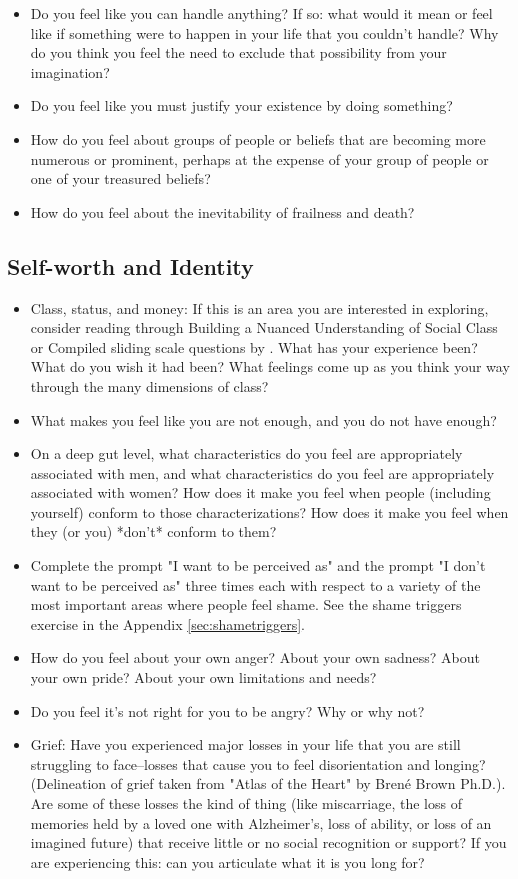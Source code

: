 \documentclass[12pt,letterpaper]{book}
\begin{document}
\begin{itemize}
    \item Do you feel like you can handle anything? If so: what would it mean or feel like if something were to happen in your life that you couldn't handle? Why do you think you feel the need to exclude that possibility from your imagination?
    \item Do you feel like you must justify your existence by doing something?
    \item How do you feel about groups of people or beliefs that are becoming more numerous or prominent, perhaps at the expense of your group of people or one of your treasured beliefs?
    \item How do you feel about the inevitability of frailness and death?
\end{itemize}

\subsection*{Self-worth and Identity}
\begin{itemize}
    \item Class, status, and money: If this is an area you are interested in exploring, consider reading through Building a Nuanced Understanding of Social Class or Compiled sliding scale questions by \textcite{harperClass} . What has your experience been? What do you wish it had been? What feelings come up as you think your way through the many dimensions of class?
    \item  What makes you feel like you are not enough, and you do not have enough?
    \item  On a deep gut level, what characteristics do you feel are appropriately associated with men, and what characteristics do you feel are appropriately associated with women? How does it make you feel when people (including yourself) conform to those characterizations? How does it make you feel when they (or you) *don't* conform to them?
    \item  Complete the prompt "I want to be perceived as" and the prompt "I don't want to be perceived as" three times each with respect to a variety of the most important areas where people feel shame. See the shame triggers exercise in the Appendix \ref{sec:shametriggers}.
    \item  How do you feel about your own anger? About your own sadness? About your own pride? About your own limitations and needs?
    \item  Do you feel it's not right for you to be angry? Why or why not?
    \item  Grief: Have you experienced major losses in your life that you are still struggling to face–losses that cause you to feel disorientation and longing? (Delineation of grief taken from "Atlas of the Heart" by Brené Brown Ph.D.). Are some of these losses the kind of thing (like miscarriage, the loss of memories held by a loved one with Alzheimer's, loss of ability, or loss of an imagined future) that receive little or no social recognition or support? If you are experiencing this: can you articulate what it is you long for?
\end{itemize}
\end{document}
